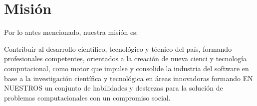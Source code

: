 \section{Misión}\label{sec:cs-mision}
\noindent Por lo antes mencionado, nuestra misión es: 

Contribuir al desarrollo científico, tecnológico y técnico del país,  
formando profesionales competentes, orientados a la creación de nueva 
cienci y tecnología computacional, como motor que impulse y consolide la industria 
del software en base a la investigación científica y tecnológica en 
áreas innovadoras formando EN NUESTROS un conjunto de habilidades y 
destrezas para la solución de problemas computacionales con un compromiso social.